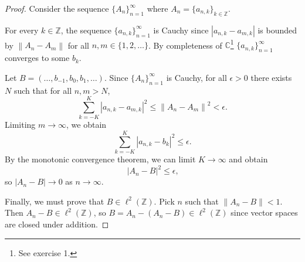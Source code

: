 \documentclass[oneside]{article}
\newcommand\abs[1]{\left|#1\right|}
\newcommand\norm[1]{\left\|#1\right\|}
\newcommand\bbC{\mathbb{C}}
\newcommand\bbZ{\mathbb{Z}}
\begin{document}
  \begin{proof}
    Consider the sequence $\{A_n\}_{n=1}^\infty$ where $A_n = \{a_{n,k}\}_{k\in\bbZ}$.

    For every $k \in \bbZ$, the sequence $\{a_{n,k}\}_{n=1}^\infty$ is Cauchy since $\abs{a_{n,k} - a_{m,k}}$ is bounded by $\norm{A_n - A_m}$ for all $n, m \in \{1, 2, \dots \}$. By completeness of $\bbC$\footnote{See exercise 1.} $\{a_{n,k}\}_{n=1}^\infty$ converges to some $b_k$.

    Let $B = (\dots, b_{-1}, b_0, b_1, \dots)$. Since $\{A_n\}_{n=1}^\infty$ is Cauchy, for all $\epsilon>0$ there exists $N$ such that for all $n, m > N$, \[
      \sum_{k=-K}^K \abs{a_{n,k} - a_{m,k}}^2
      \leq \norm{A_n - A_m}^2 < \epsilon \text{.}
    \] Limiting $m \to \infty$, we obtain \[
      \sum_{k=-K}^K \abs{a_{n,k} - b_k}^2
      \leq \epsilon \text{.}
    \] By the monotonic convergence theorem, we can limit $K \to \infty$ and obtain\[
      \abs{A_n - B}^2 \leq \epsilon \text{,}
    \] so $\abs{A_n - B} \to 0$ as $n \to \infty$.

    Finally, we must prove that $B \in \ell^2(\bbZ)$. Pick $n$ such that $\norm{A_n - B} < 1$. Then $A_n - B \in \ell^2(\bbZ)$, so $B = A_n - (A_n - B) \in \ell^2(\bbZ)$ since vector spaces are closed under addition.
  \end{proof}
\end{document}
